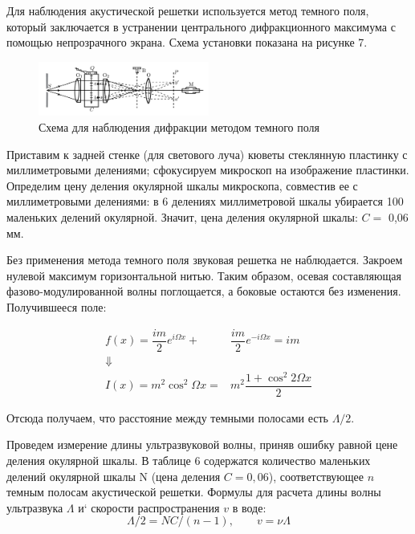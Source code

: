 \documentclass[journal, a4paper]{IEEEtran}
\begin{document}
Для наблюдения акустической решетки используется метод темного поля, который заключается в устранении центрального дифракционного максимума с помощью непрозрачного экрана. Схема установки показана на рисунке 7.

	\begin{figure}[h!]
	\centering	
	\includegraphics[width=0.5\textwidth]{shema2.png}
	\caption{Схема для наблюдения дифракции методом темного поля}
	\label{shema2}
\end{figure}

Приставим к задней стенке (для светового луча) кюветы стеклянную пластинку с миллиметровыми делениями; сфокусируем микроскоп на изображение пластинки. Определим цену деления окулярной шкалы микроскопа, совместив ее с миллиметровыми делениями: в 6 делениях миллиметровой шкалы убирается 100 маленьких делений окулярной. Значит, цена деления окулярной шкалы: $ C = $ 0,06 мм.

Без применения метода темного поля звуковая решетка не наблюдается. Закроем нулевой максимум горизонтальной нитью. Таким образом, осевая составляющая фазово-модулированной волны поглощается, а боковые остаются без изменения. Получившееся поле: 

\begin{equation}\label{}
\begin{aligned}
f(x) = \dfrac{im}{2} e^{i\Omega x} +  &\dfrac{im}{2} e^{-i\Omega x} = im\\ \Downarrow&\\
I(x) = m^2 \cos ^2 \Omega x = &m^2 \dfrac{1 + \cos ^2 2 \Omega x}{2}
\end{aligned}
\end{equation}

Отсюда получаем, что расстояние между темными полосами есть $ \Lambda/2 $.

Проведем измерение длины ультразвуковой волны, приняв ошибку равной цене деления окулярной шкалы. В таблице 6 содержатся количество маленьких делений окулярной шкалы N (цена деления $ C = 0,06 $), соответствующее $ n $ темным полосам акустической решетки.
Формулы для расчета длины волны ультразвука $ \Lambda $ и` скорости распространения $ v $ в воде:
\begin{equation}\label{}
\Lambda/2  = NC/(n - 1),  \qquad v = \nu\Lambda
\end{equation}
\end{document}

